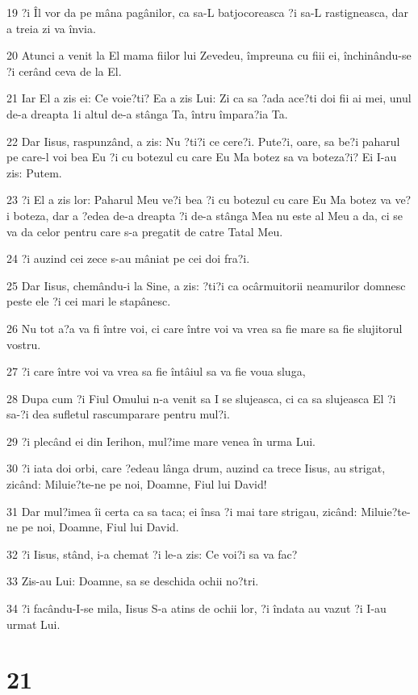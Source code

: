 \par 19 ?i Îl vor da pe mâna pagânilor, ca sa-L batjocoreasca ?i sa-L rastigneasca, dar a treia zi va învia.
\par 20 Atunci a venit la El mama fiilor lui Zevedeu, împreuna cu fiii ei, închinându-se ?i cerând ceva de la El.
\par 21 Iar El a zis ei: Ce voie?ti? Ea a zis Lui: Zi ca sa ?ada ace?ti doi fii ai mei, unul de-a dreapta 1i altul de-a stânga Ta, întru împara?ia Ta.
\par 22 Dar Iisus, raspunzând, a zis: Nu ?ti?i ce cere?i. Pute?i, oare, sa be?i paharul pe care-l voi bea Eu ?i cu botezul cu care Eu Ma botez sa va boteza?i? Ei I-au zis: Putem.
\par 23 ?i El a zis lor: Paharul Meu ve?i bea ?i cu botezul cu care Eu Ma botez va ve?i boteza, dar a ?edea de-a dreapta ?i de-a stânga Mea nu este al Meu a da, ci se va da celor pentru care s-a pregatit de catre Tatal Meu.
\par 24 ?i auzind cei zece s-au mâniat pe cei doi fra?i.
\par 25 Dar Iisus, chemându-i la Sine, a zis: ?ti?i ca ocârmuitorii neamurilor domnesc peste ele ?i cei mari le stapânesc.
\par 26 Nu tot a?a va fi între voi, ci care între voi va vrea sa fie mare sa fie slujitorul vostru.
\par 27 ?i care între voi va vrea sa fie întâiul sa va fie voua sluga,
\par 28 Dupa cum ?i Fiul Omului n-a venit sa I se slujeasca, ci ca sa slujeasca El ?i sa-?i dea sufletul rascumparare pentru mul?i.
\par 29 ?i plecând ei din Ierihon, mul?ime mare venea în urma Lui.
\par 30 ?i iata doi orbi, care ?edeau lânga drum, auzind ca trece Iisus, au strigat, zicând: Miluie?te-ne pe noi, Doamne, Fiul lui David!
\par 31 Dar mul?imea îi certa ca sa taca; ei însa ?i mai tare strigau, zicând: Miluie?te-ne pe noi, Doamne, Fiul lui David.
\par 32 ?i Iisus, stând, i-a chemat ?i le-a zis: Ce voi?i sa va fac?
\par 33 Zis-au Lui: Doamne, sa se deschida ochii no?tri.
\par 34 ?i facându-I-se mila, Iisus S-a atins de ochii lor, ?i îndata au vazut ?i I-au urmat Lui.

\chapter{21}

